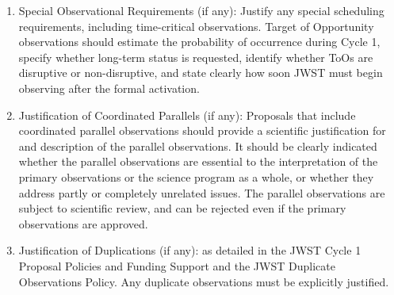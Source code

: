 \documentclass[12pt]{article}
\begin{document}
\begin{enumerate}
\item Special Observational Requirements (if any): Justify any special scheduling requirements, including time-critical observations. Target of Opportunity observations should estimate the probability of occurrence during Cycle 1, specify whether long-term status is requested, identify whether ToOs are disruptive or non-disruptive, and state clearly how soon JWST must begin observing after the formal activation. 
\item Justification of Coordinated Parallels (if any): Proposals that include coordinated parallel observations should provide a scientific justification for and description of the parallel observations. It should be clearly indicated whether the parallel observations are essential to the interpretation of the primary observations or the science program as a whole, or whether they address partly or completely unrelated issues. The parallel observations are subject to scientific review, and can be rejected even if the primary observations are approved. 
\item Justification of Duplications (if any): as detailed in the JWST Cycle 1 Proposal Policies and Funding Support and the JWST Duplicate Observations Policy. Any duplicate observations must be explicitly justified.
\end{enumerate}


  

%
%
\specialreq             %


%
%
\coordinatedobs %


%
%
\duplications           %


%
%
\analysisplan %

\end{document}
